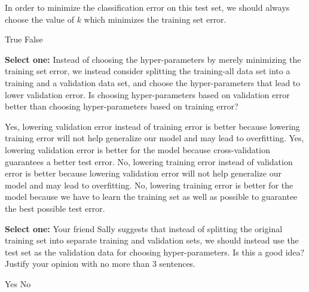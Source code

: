 \documentclass[11pt,addpoints,answers]{exam}
\newcommand{\sone}{\textbf{Select one: }}
\begin{document}
\begin{questions}
\begin{parts}
    \begin{subparts}
    
        \subpart[1] In order to minimize the classification error on this test set, we should always choose the value of $k$ which minimizes the training set error. 

    \begin{checkboxes}
        \choice True
        \choice False
    \end{checkboxes}

    \clearpage 
    \subpart[2] \sone Instead of choosing the hyper-parameters by merely minimizing the training set error, we instead consider splitting the training-all data set into a training and a validation data set, and choose the hyper-parameters that lead to lower validation error. Is choosing hyper-parameters based on validation error better than choosing hyper-parameters based on training error?

    \begin{checkboxes}
        \choice Yes, lowering validation error instead of training error is better because lowering training error will not help generalize our model and may lead to overfitting.
        \choice Yes, lowering validation error is better for the model because cross-validation guarantees a better test error.
        \choice No, lowering training error instead of validation error is better because lowering validation error will not help generalize our model and may lead to overfitting.
        \choice No, lowering training error is better for the model because we have to learn the training set as well as possible to guarantee the best possible test error.
    \end{checkboxes}
    
    \subpart[2] \sone Your friend Sally suggests that instead of splitting the original training set into separate training and validation sets, we should instead use the test set as the validation data for choosing hyper-parameters. Is this a good idea? Justify your opinion with no more than 3 sentences.
    
    \begin{checkboxes}
        \choice Yes
        \choice No
    \end{checkboxes}

    \begin{your_solution}[title=Your answer:,height=5cm,width=15cm]
    \end{your_solution}

    \end{subparts}


\end{parts}
\end{questions}
\end{document}
